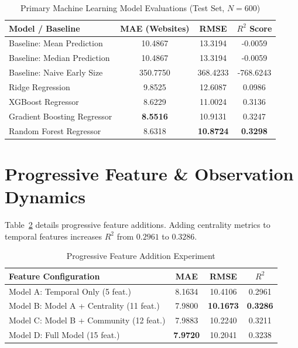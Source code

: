 \documentclass[10pt,journal,compsoc]{IEEEtran}
\begin{document}
\begin{table}[h]
\caption{Primary Machine Learning Model Evaluations (Test Set, $N=600$)}
\label{tab:ml_evaluations}
\centering
\begin{tabular}{lccc}
\toprule
\textbf{Model / Baseline} & \textbf{MAE (Websites)} & \textbf{RMSE} & \textbf{$R^2$ Score} \\
\midrule
Baseline: Mean Prediction & 10.4867 & 13.3194 & -0.0059 \\
Baseline: Median Prediction & 10.4867 & 13.3194 & -0.0059 \\
Baseline: Naive Early Size & 350.7750 & 368.4233 & -768.6243 \\
Ridge Regression & 9.8525 & 12.6087 & 0.0986 \\
XGBoost Regressor & 8.6229 & 11.0024 & 0.3136 \\
Gradient Boosting Regressor & \textbf{8.5516} & 10.9131 & 0.3247 \\
Random Forest Regressor & 8.6318 & \textbf{10.8724} & \textbf{0.3298} \\
\bottomrule
\end{tabular}
\end{table}

\section{Progressive Feature & Observation Dynamics}
Table~\ref{tab:progressive} details progressive feature additions. Adding centrality metrics to temporal features increases $R^2$ from $0.2961$ to $0.3286$.

\begin{table}[h]
\caption{Progressive Feature Addition Experiment}
\label{tab:progressive}
\centering
\begin{tabular}{lccc}
\toprule
\textbf{Feature Configuration} & \textbf{MAE} & \textbf{RMSE} & \textbf{$R^2$} \\
\midrule
Model A: Temporal Only (5 feat.) & 8.1634 & 10.4106 & 0.2961 \\
Model B: Model A + Centrality (11 feat.) & 7.9800 & \textbf{10.1673} & \textbf{0.3286} \\
Model C: Model B + Community (12 feat.) & 7.9883 & 10.2240 & 0.3211 \\
Model D: Full Model (15 feat.) & \textbf{7.9720} & 10.2041 & 0.3238 \\
\bottomrule
\end{tabular}
\end{table}
\end{document}
